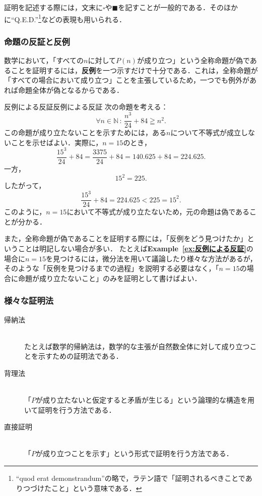 \documentclass[a4paper,11pt]{ltjsarticle}
\newcommand{\exref}[1]{\textsf{\bfseries Example~\ref{ex:#1}}}
\renewcommand{\geq}{\geqq}
\begin{document}
\begin{mycolumn}
  証明を記述する際には，文末に$\square$や$\blacksquare$を記すことが一般的である．そのほかに``Q.E.D.''\footnote{``quod erat demonstrandum''の略で，ラテン語で「証明されるべきことでありつづけたこと」という意味である．}などの表現も用いられる．
\end{mycolumn}

\subsubsection{命題の反証と反例}

数学において，「すべての$n$に対して$P(n)$が成り立つ」という全称命題が偽であることを証明するには，\textbf{反例}を一つ示すだけで十分である．これは，全称命題が「すべての場合において成り立つ」ことを主張しているため，一つでも例外があれば命題全体が偽となるからである．

\begin{example}{反例による反証}{反例による反証}
  次の命題を考える：
  \[
    \forall n \in \mathbb{N}\, : \, \frac{n^3}{24} + 84 \geq n^2.
  \]
  この命題が成り立たないことを示すためには，ある$n$について不等式が成立しないことを示せばよい．実際に，$n = 15$のとき，
  \[
    \frac{15^3}{24} + 84 = \frac{3375}{24} + 84 = 140.625 + 84 = 224.625.
  \]
  一方，
  \[
    15^2 = 225.
  \]
  したがって，
  \[
    \frac{15^3}{24} + 84 = 224.625 < 225 = 15^2.
  \]
  このように，$n = 15$において不等式が成り立たないため，元の命題は偽であることが分かる．
\end{example}

また，全称命題が偽であることを証明する際には，「反例をどう見つけたか」ということは明記しない場合が多い．
たとえば\exref{反例による反証}の場合に$n=15$を見つけるには，微分法を用いて議論したり様々な方法があるが，そのような「反例を見つけるまでの過程」を説明する必要はなく，「$n=15$の場合に命題が成り立たないこと」のみを証明として書けばよい．

\subsubsection{様々な証明法}

\begin{description}
  \item[帰納法] \mbox{} \\
        たとえば数学的帰納法は，数学的な主張が自然数全体に対して成り立つことを示すための証明法である．
  \item[背理法] \mbox{} \\
        「$P$が成り立たないと仮定すると矛盾が生じる」という論理的な構造を用いて証明を行う方法である．
  \item[直接証明] \mbox{} \\
        「$P$が成り立つことを示す」という形式で証明を行う方法である．
\end{description}
\end{document}
